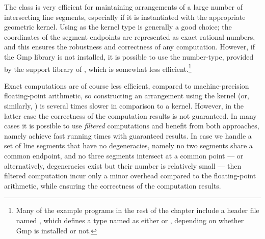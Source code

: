The  class is very efficient for
maintaining arrangements of a large number of intersecting line
segments, especially if it is instantiated with the appropriate
geometric kernel. Using  as the kernel type is
generally a good choice; the coordinates of the segment endpoints are
represented as exact rational numbers, and this ensures the robustness
and correctness of any computation. However, if the {\sc Gmp}
library is not installed, it is possible to use the
 number-type, provided by the support library
of \cgal, which is somewhat less efficient.\footnote{Many of the
example programs in the rest of the chapter include a header file
named , which defines a type named
 as either  or ,
depending on whether {\sc Gmp} is installed or not.}

Exact computations are of course less efficient, compared to
machine-precision floating-point arithmetic, so constructing an
arrangement using the  kernel (or, similarly,
)  is several times slower in
comparison to a  kernel. However, in
the latter case the correctness of the computation results is not
guaranteed. In many cases it is possible to use \emph{filtered}
computations and benefit from both approaches, namely achieve fast
running times with guaranteed results. In case we handle a set of
line segments that have no degeneracies, namely no two segments
share a common endpoint, and no three segments intersect at a common
point --- or alternatively, degeneracies exist but their number is
relatively small --- then filtered computation incur only a minor
overhead compared to the floating-point arithmetic, while ensuring
the correctness of the computation results.


